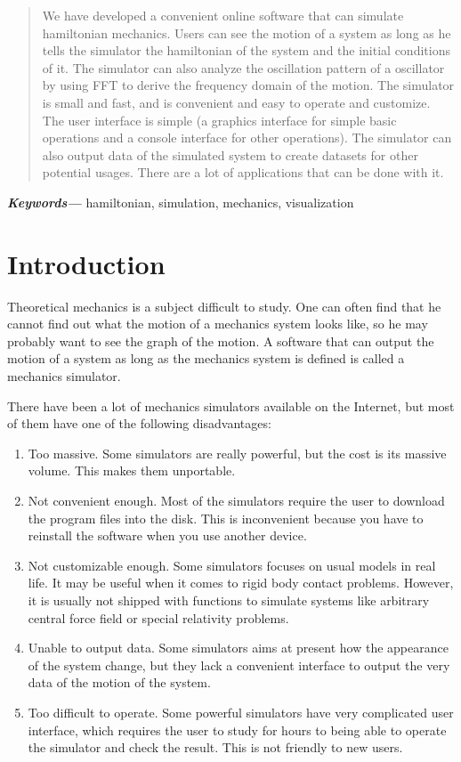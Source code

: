 \documentclass[12pt]{article}
\providecommand{\keywords}[1]{\small\textbf{\textit{Keywords---}} #1}
\begin{document}
\begin{abstract}
We have developed a convenient online software that can simulate hamiltonian mechanics.
Users can see the motion of a system as long as he tells the simulator
the hamiltonian of the system and the initial conditions of it.
The simulator can also analyze the oscillation pattern of a oscillator
by using FFT to derive the frequency domain of the motion.
The simulator is small and fast, and is convenient and easy to operate and customize.
The user interface is simple (a graphics interface for simple basic operations
and a console interface for other operations).
The simulator can also output data of the simulated system to create datasets
for other potential usages.
There are a lot of applications that can be done with it.
\end{abstract}

\keywords{hamiltonian, simulation, mechanics, visualization}

\tableofcontents

\section{Introduction}
\label{sec:intro}

Theoretical mechanics is a subject difficult to study.
One can often find that he cannot find out what the motion of a mechanics system looks like,
so he may probably want to see the graph of the motion.
A software that can output the motion of a system as long as the mechanics system is defined is called a mechanics simulator.

There have been a lot of mechanics simulators available on the Internet,
but most of them have one of the following disadvantages:
\begin{enumerate}
  \item Too massive.
  Some simulators are really powerful, but the cost is its massive volume.
  This makes them unportable.

  \item Not convenient enough.
  Most of the simulators require the user to download the program files into the disk.
  This is inconvenient because you have to reinstall the software when you use another device.

  \item Not customizable enough.
  Some simulators focuses on usual models in real life.
  It may be useful when it comes to rigid body contact problems.
  However, it is usually not shipped with functions to simulate systems like arbitrary central force field or special relativity problems.

  \item Unable to output data.
  Some simulators aims at present how the appearance of the system change,
  but they lack a convenient interface to output the very data of the motion of the system.

  \item Too difficult to operate.
  Some powerful simulators have very complicated user interface,
  which requires the user to study for hours to being able to operate the simulator and check the result.
  This is not friendly to new users.
\end{enumerate}
\end{document}
